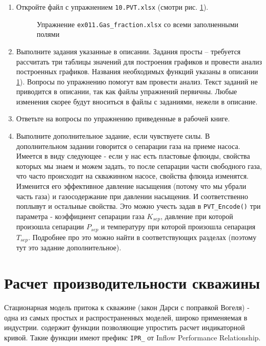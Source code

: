 \begin{enumerate}
	
	\item Откройте файл с упражнением \texttt{10.PVT.xlsx} (смотри рис. \ref{ris:Ex11_1}).
	
	\begin{figure}[h!]
		\center{\texttt{[image: Ex11\_1]}}
		\caption{Упражнение \texttt{ex011.Gas_fraction.xlsx} со всеми заполненными полями }
		\label{ris:Ex11_1}
	\end{figure}
	
	\item Выполните задания указанные в описании. Задания просты -- требуется рассчитать три таблицы значений для построения графиков и провести анализ построенных графиков. Названия необходимых функций указаны в описании  \ref{ris:Ex11_1}). Вопросы по упражнению помогут вам провести анализ. Текст заданий не приводится в описании, так как файлы упражнений первичны. Любые изменения скорее будут вноситься в файлы с заданиями, нежели в описание.
	
	\item Ответьте на вопросы по упражнению приведенные в рабочей книге.
	
	\item Выполните дополнительное задание, если чувствуете силы. В дополнительном задании говорится о сепарации газа на приеме насоса. Имеется в виду следующее - если у нас есть пластовые флюиды, свойства которых мы знаем и можем задать, то после сепарации части свободного газа, что часто происходит на скважинном насосе, свойства флюида изменятся. Изменится его эффективное давление насыщения (потому что мы убрали часть газа) и газосодержание при давлении насыщения. И соответственно поплывут и остальные свойства. Это можно учесть задав в \texttt{PVT_Encode()} три параметра - коэффициент сепарации газа $K_{sep}$, давление при которой произошла сепарации $P_{sep}$ и температуру при которой произошла сепарация $T_{sep}$. Подробнее про это можно найти в соответствующих разделах (поэтому тут это задание дополнительное).
	
\end{enumerate}

\section{Расчет производительности скважины}

Стационарная модель притока к скважине (закон Дарси с поправкой Вогеля) - одна из самых простых и распространенных моделей, широко применяемая в индустрии. \unf{} содержит функции позволяющие упростить расчет индикаторной кривой. Такие функции имеют префикс \texttt{IPR_} от Inflow Performance Relationship.

